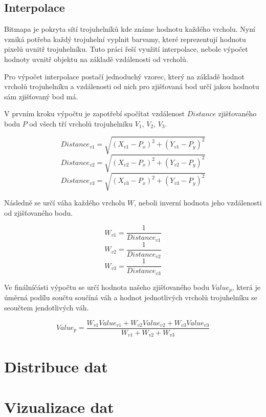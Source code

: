 \documentclass[czech,bachelor,dept460,male,csharp,cpdeclaration]{diploma}
\begin{document}
	\subsection{Interpolace}
	
	Bitmapa je pokryta sítí trojuhelníků kde známe hodnotu každého vrcholu. Nyní vzniká potřeba každý trojuhelní vyplnit barvamy, které reprezentují hodnotu pixelů uvnitř trojuhelníku. Tuto práci řeší využití interpolace, nebole výpočet hodnoty uvnitř objektu na základě vzdálenosti od vrcholů.
	
	Pro výpočet interpolace postačí jednoduchý vzorec, který na základě hodnot vrcholů trojuhelníku a vzdálenosti od nich pro zjišťovaná bod určí jakou hodnotu sám zjišťovaný bod má.
	
	
	V prvním kroku výpočtu je zapotřebí spočítat vzdálenost $Distance$ zjišťovaného bodu $P$ od všech tří vrcholů trojuhelníku $V_1$, $V_2$, $V_3$. 
	
	\[Distance_{v1} =\sqrt{(X_{v1}-P_x)^2+(Y_{v1}-P_y)^2}\]
	\[Distance_{v2} =\sqrt{(X_{v2}-P_x)^2+(Y_{v2}-P_y)^2}\]
	\[Distance_{v3} =\sqrt{(X_{v3}-P_x)^2+(Y_{v3}-P_y)^2}\]
	
	Následně se určí váha každého vrcholu $W$, neboli inverní hodnota jeho vzdálenosti od zjišťovaného bodu.
	
	\[W_{v1} =\frac{1}{Distance_{v1}}\]
	\[W_{v2} =\frac{1}{Distance_{v2}}\]
	\[W_{v3} =\frac{1}{Distance_{v3}}\]
	
	Ve finálníčásti výpočtu se určí hodnota našeho zjišťovaného bodu $Value_p$, která je úměrná podílu součtu součíná váh a hodnot jednotlivých vrcholů trojuhelníku se seoučtem jendotlivých váh.
	
	\[Value_p = \frac{W_{v1}Value_{v1} + W_{v2}Value_{v2} + W_{v3}Value_{v3}}{W_{v1} + W_{v2} + W_{v3}} \]
	
	
	\section{Distribuce dat}
	
	\section{Vizualizace dat}
	
\end{document}
